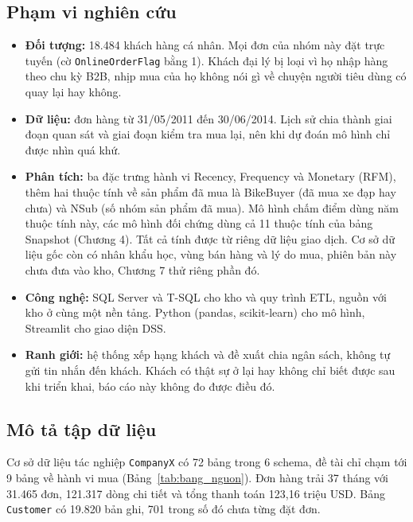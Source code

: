 \subsection{Phạm vi nghiên cứu}
\begin{itemize}
    \item \textbf{Đối tượng:} 18.484 khách hàng cá nhân. Mọi đơn của nhóm này đặt trực tuyến (cờ \texttt{OnlineOrderFlag} bằng 1). Khách đại lý bị loại vì họ nhập hàng theo chu kỳ B2B, nhịp mua của họ không nói gì về chuyện người tiêu dùng có quay lại hay không.
    \item \textbf{Dữ liệu:} đơn hàng từ 31/05/2011 đến 30/06/2014. Lịch sử chia thành giai đoạn quan sát và giai đoạn kiểm tra mua lại, nên khi dự đoán mô hình chỉ được nhìn quá khứ.
    \item \textbf{Phân tích:} ba đặc trưng hành vi Recency, Frequency và Monetary (RFM), thêm hai thuộc tính về sản phẩm đã mua là BikeBuyer (đã mua xe đạp hay chưa) và NSub (số nhóm sản phẩm đã mua). Mô hình chấm điểm dùng năm thuộc tính này, các mô hình đối chứng dùng cả 11 thuộc tính của bảng Snapshot (Chương 4). Tất cả tính được từ riêng dữ liệu giao dịch. Cơ sở dữ liệu gốc còn có nhân khẩu học, vùng bán hàng và lý do mua, phiên bản này chưa đưa vào kho, Chương 7 thử riêng phần đó.
    \item \textbf{Công nghệ:} SQL Server và T-SQL cho kho và quy trình ETL, nguồn với kho ở cùng một nền tảng. Python (pandas, scikit-learn) cho mô hình, Streamlit cho giao diện DSS.
    \item \textbf{Ranh giới:} hệ thống xếp hạng khách và đề xuất chia ngân sách, không tự gửi tin nhắn đến khách. Khách có thật sự ở lại hay không chỉ biết được sau khi triển khai, báo cáo này không đo được điều đó.
\end{itemize}

\subsection{Mô tả tập dữ liệu}
Cơ sở dữ liệu tác nghiệp \texttt{CompanyX} có 72 bảng trong 6 schema, đề tài chỉ chạm tới 9 bảng về hành vi mua (Bảng~\ref{tab:bang_nguon}). Đơn hàng trải 37 tháng với 31.465 đơn, 121.317 dòng chi tiết và tổng thanh toán 123,16 triệu USD. Bảng \texttt{Customer} có 19.820 bản ghi, 701 trong số đó chưa từng đặt đơn.

